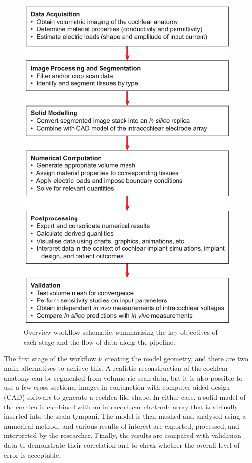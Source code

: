\begin{figure}
	\centering
	\includegraphics[width=11.8cm]{Methodology/workflow_general}
	\caption[Overview workflow schematic]{Overview workflow schematic, summarising
	the key objectives of each stage and the flow of data along the pipeline.}
	\label{fig:workflow_general}
\end{figure}

The first stage of the workflow is creating the model geometry, and there are
two main alternatives to achieve this. A realistic reconstruction of the
cochlear anatomy can be segmented from volumetric scan data, but it is also
possible to use a few cross-sectional images in conjunction with computer-aided
design (CAD) software to generate a cochlea-like shape. In either case, a solid
model of the cochlea is combined with an intracochlear electrode array that is
virtually inserted into the scala tympani. The model is then meshed and analysed
using a numerical method, and various results of interest are exported,
processed, and interpreted by the researcher. Finally, the \insilico{} results
are compared with \invivo{} validation data to demonstrate their correlation
and to check whether the overall level of error is acceptable.

